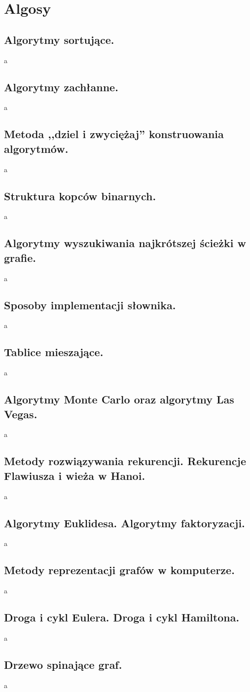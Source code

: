 \documentclass[a4paper,12pt,oneside]{book}
\begin{document}
		\newpage\section{Algosy}
			\subsection{\color{red}Algorytmy sortujące.}
				a
			\newpage\subsection{\color{red}Algorytmy zachłanne.}
				a
			\newpage\subsection{\color{red}Metoda ,,dziel i zwyciężaj'' konstruowania algorytmów.}
				a
			\newpage\subsection{\color{red}Struktura kopców binarnych.}
				a
			\newpage\subsection{\color{red}Algorytmy wyszukiwania najkrótszej ścieżki w grafie.}
				a
			\newpage\subsection{\color{red}Sposoby implementacji słownika.}
				a
			\newpage\subsection{\color{red}Tablice mieszające.}
				a
			\newpage\subsection{\color{red}Algorytmy Monte Carlo oraz algorytmy Las Vegas.}
				a
			\newpage\subsection{\color{red}Metody rozwiązywania rekurencji. Rekurencje Flawiusza i wieża w Hanoi.}
				a
			\newpage\subsection{\color{red}Algorytmy Euklidesa. Algorytmy faktoryzacji.}
				a
			\newpage\subsection{\color{red}Metody reprezentacji grafów w komputerze.}
				a
			\newpage\subsection{\color{red}Droga i cykl Eulera. Droga i cykl Hamiltona.}
				a
			\newpage\subsection{\color{red}Drzewo spinające graf.}
				a
		
\end{document}
